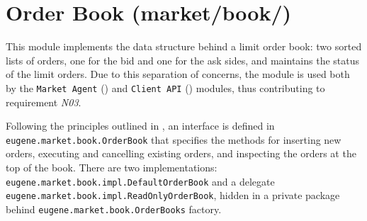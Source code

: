 \section{Order Book (market/book/)}
This module implements the data structure behind a limit order book: two sorted lists of orders, one for the bid and one for the ask sides, and maintains the status of the limit orders. Due to this separation of concerns, the module is used both by the \texttt{Market~Agent} () and \texttt{Client~API} () modules, thus contributing to requirement \textit{N03}.

Following the principles outlined in , an interface is defined in \\ \texttt{eugene.market.book.OrderBook} that specifies the methods for inserting new orders, executing and cancelling existing orders, and inspecting the orders at the top of the book. There are two implementations: \texttt{eugene.market.book.impl.DefaultOrderBook} and a delegate \texttt{eugene.market.book.impl.ReadOnlyOrderBook}, hidden in a private package behind \texttt{eugene.market.book.OrderBooks} factory.  
